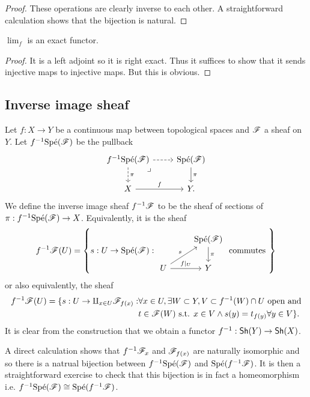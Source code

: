 \documentclass{memoir}
\begin{document}
\begin{proof}
    These operations are clearly inverse to each other.
    A straightforward calculation shows that the bijection is natural.
\end{proof}
\begin{corollary}
    $\lim_f$ is an exact functor.
\end{corollary}
\begin{proof}
    It is a left adjoint so it is right exact. 
    Thus it suffices to show that it sends injective maps to injective maps. But this is obvious.
\end{proof}
\subsection{Inverse image sheaf}
Let $f:X\to Y$ be a continuous map between topological spaces and $\mathscr{F}$ a sheaf on $Y$.
Let $f^{-1}\text{Sp\'e}(\mathscr{F})$ be the pullback 
\begin{equation}
    \begin{tikzcd}
        f^{-1}\Spe(\shf{F}) \arrow[r,dashed] \arrow[d,dashed,"\pi"] \arrow[dr, phantom, "\lrcorner", very near start] & \Spe(\shf{F}) \arrow[d,"\pi"] \\
        X \arrow[r,"f"] & Y.
    \end{tikzcd}
\end{equation}
We define the inverse image sheaf $f^{-1}\mathscr{F}$ to be the sheaf of sections of $\pi:f^{-1}\text{Sp\'e}(\mathscr{F})\to X$.
Equivalently, it is the sheaf
\begin{equation}
    \label{eq:invimg}
    f^{-1}\shf{F}(U) = \left\{s:U\to\Spe(\shf{F}): 
    \begin{tikzcd}
        & \Spe(\shf{F}) \arrow[d,"\pi"] \\
        U \arrow[r,"f|_U"] \arrow[ur,"s"] & Y
    \end{tikzcd} 
    \text{ commutes }
    \right\}
\end{equation}
or also equivalently, the sheaf
\begin{align}
    f^{-1}\mathscr{F}(U) = \{s:U\to\amalg_{x\in U}\mathscr{F}_{f(x)} : & \forall x\in U, \exists W\subset Y, V\subset f^{-1}(W)\cap U \text{ open and} \nonumber \\
                                                             & t\in\mathscr{F}(W) \text{ s.t. } x\in V \wedge  s(y) = t_{f(y)} \forall y\in V\}.
\end{align}
It is clear from the construction that we obtain a functor $f^{-1}:{\normalfont\mathsf{Sh}}(Y)\to{\normalfont\mathsf{Sh}}(X)$.
\begin{remark}
    A direct calculation shows that $f^{-1}\mathscr{F}_x$ and $\mathscr{F}_{f(x)}$ are naturally isomorphic and so there is a natrual bijection between $f^{-1}\text{Sp\'e}(\mathscr{F})$ and $\text{Sp\'e}(f^{-1}\mathscr{F})$.
    It is then a straightforward exercise to check that this bijection is in fact a homeomorphism i.e. $f^{-1}\text{Sp\'e}(\mathscr{F})\cong\text{Sp\'e}(f^{-1}\mathscr{F})$.
\end{remark}
\end{document}
